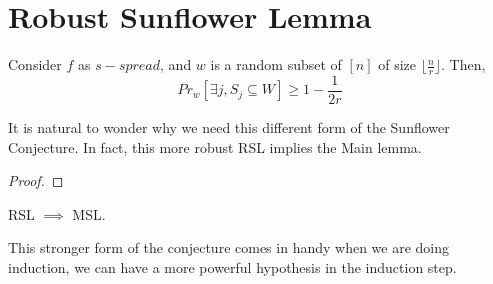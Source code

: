 \section{Robust Sunflower Lemma}
\begin{lemma}
	Consider $f$ as $s-spread$, and $w$ is a random subset of $[n]$ of size $\lfloor \frac{n}{r} \rfloor$. Then, 
	\begin{equation}
		Pr_{w} [\exists j, S_j \subseteq W] \geq 1 - \frac{1}{2r}
	\end{equation}
\end{lemma}

It is natural to wonder why we need this different form of the Sunflower Conjecture. In fact, this more robust RSL implies the Main lemma. 
\begin{proof}
	
\end{proof}


\begin{proposition}
	RSL $\implies$ MSL. 
\end{proposition}
This stronger form of the conjecture comes in handy when we are doing induction, we can have a more powerful hypothesis in the induction step. 

